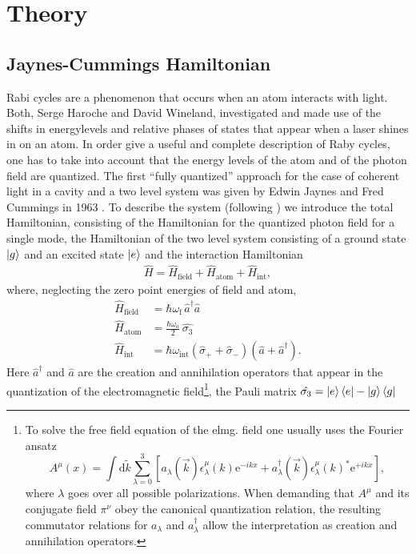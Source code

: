 \section{Theory}

\subsection{Jaynes-Cummings Hamiltonian}
Rabi cycles are a phenomenon that occurs when an atom interacts with light.
Both, Serge Haroche and David Wineland, investigated and made use of the
shifts in energylevels and relative phases of states that appear when a laser
shines in on an atom.  In
order give a useful and complete description of Raby cycles, one has to take into
account that the energy levels of the atom and of the photon field are
quantized. The first ``fully quantized'' approach for the case of coherent light
in a cavity and a two level system was given by Edwin Jaynes and Fred Cummings
in 1963 \cite{jaynes1963comparison}. To describe the system (following
\cite{gerry2005introductory}) 
we introduce the total Hamiltonian, consisting of the Hamiltonian for the 
 quantized photon field for a single mode, the Hamiltonian of the two level
 system consisting of a ground state $\ket{g}$ and an excited state $\ket{e}$ and the
 interaction Hamiltonian
\begin{align}
  \label{eq:JCM_H_tot}
  {\hat {H}}={\hat {H}}_{{{\text{field}}}}+{\hat {H}}_{{{\text{atom}}}}+{\hat
  {H}}_{{{\text{int}}}},
\end{align}
where, neglecting the zero point energies of field and atom,
\begin{align}
  \label{eq:JCM_H_field}
  \hat{H}_{\text{field}} &= \hbar \omega_{\text{f}}\, \hat{a}^\dagger
   \hat{a}\\
  \label{eq:JCM_H_atom}
  \hat{H}_{\text{atom}} &= \frac{\hbar \omega_a}{2} \, \hat{\sigma_3} \\
  \label{eq:JCM_H_int}
  \hat{H}_{\text{int}} &= \hbar \omega_{\text{int}} \left( \hat{\sigma}_+ +
\hat{\sigma}_-\right)\left(\hat{a} + \hat{a}^\dagger\right).
\end{align}
Here $\hat{a}^\dagger$ and $\hat{a}$ are the creation and annihilation operators
that appear in the quantization of the electromagnetic field\footnote{To solve
the free field equation of the elmg. field one usually uses the Fourier ansatz
$$A^\mu(x) = \int \text{d}\tilde{k} \sum_{\lambda=0}^3 \left[ a_\lambda(\vec{k})
\epsilon^\mu_\lambda(k)\text{e}^{-ikx} +
a^\dagger_\lambda(\vec{k})\epsilon^\mu_\lambda(k)^* \text{e}^{+ikx}\right], $$
where $\lambda$ goes over all possible polarizations. When demanding that
$A^\mu$ and its conjugate field $\pi^\nu$ obey the canonical quantization
relation, the resulting commutator relations for $a_\lambda$ and
$a_\lambda^\dagger$ allow the interpretation as creation and annihilation
operators.}, the Pauli matrix $\hat{\sigma_3} = \ket{e}\bra{e} - \ket{g}\bra{g}$
